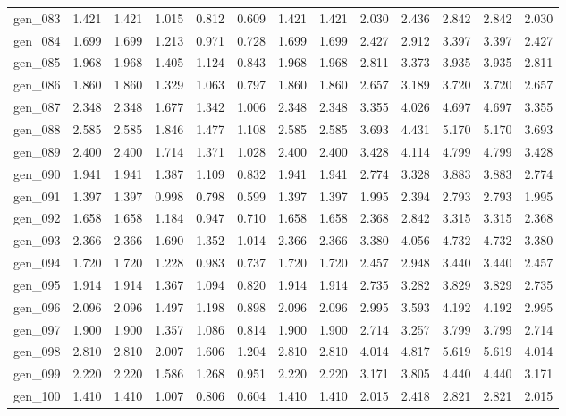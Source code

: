 \begin{tabular}{lrrrrrrrrrrrr}
gen\_083 &  1.421 &  1.421 &  1.015 &  0.812 &  0.609 &  1.421 &  1.421 &  2.030 &  2.436 &  2.842 &  2.842 &  2.030 \\
gen\_084 &  1.699 &  1.699 &  1.213 &  0.971 &  0.728 &  1.699 &  1.699 &  2.427 &  2.912 &  3.397 &  3.397 &  2.427 \\
gen\_085 &  1.968 &  1.968 &  1.405 &  1.124 &  0.843 &  1.968 &  1.968 &  2.811 &  3.373 &  3.935 &  3.935 &  2.811 \\
gen\_086 &  1.860 &  1.860 &  1.329 &  1.063 &  0.797 &  1.860 &  1.860 &  2.657 &  3.189 &  3.720 &  3.720 &  2.657 \\
gen\_087 &  2.348 &  2.348 &  1.677 &  1.342 &  1.006 &  2.348 &  2.348 &  3.355 &  4.026 &  4.697 &  4.697 &  3.355 \\
gen\_088 &  2.585 &  2.585 &  1.846 &  1.477 &  1.108 &  2.585 &  2.585 &  3.693 &  4.431 &  5.170 &  5.170 &  3.693 \\
gen\_089 &  2.400 &  2.400 &  1.714 &  1.371 &  1.028 &  2.400 &  2.400 &  3.428 &  4.114 &  4.799 &  4.799 &  3.428 \\
gen\_090 &  1.941 &  1.941 &  1.387 &  1.109 &  0.832 &  1.941 &  1.941 &  2.774 &  3.328 &  3.883 &  3.883 &  2.774 \\
gen\_091 &  1.397 &  1.397 &  0.998 &  0.798 &  0.599 &  1.397 &  1.397 &  1.995 &  2.394 &  2.793 &  2.793 &  1.995 \\
gen\_092 &  1.658 &  1.658 &  1.184 &  0.947 &  0.710 &  1.658 &  1.658 &  2.368 &  2.842 &  3.315 &  3.315 &  2.368 \\
gen\_093 &  2.366 &  2.366 &  1.690 &  1.352 &  1.014 &  2.366 &  2.366 &  3.380 &  4.056 &  4.732 &  4.732 &  3.380 \\
gen\_094 &  1.720 &  1.720 &  1.228 &  0.983 &  0.737 &  1.720 &  1.720 &  2.457 &  2.948 &  3.440 &  3.440 &  2.457 \\
gen\_095 &  1.914 &  1.914 &  1.367 &  1.094 &  0.820 &  1.914 &  1.914 &  2.735 &  3.282 &  3.829 &  3.829 &  2.735 \\
gen\_096 &  2.096 &  2.096 &  1.497 &  1.198 &  0.898 &  2.096 &  2.096 &  2.995 &  3.593 &  4.192 &  4.192 &  2.995 \\
gen\_097 &  1.900 &  1.900 &  1.357 &  1.086 &  0.814 &  1.900 &  1.900 &  2.714 &  3.257 &  3.799 &  3.799 &  2.714 \\
gen\_098 &  2.810 &  2.810 &  2.007 &  1.606 &  1.204 &  2.810 &  2.810 &  4.014 &  4.817 &  5.619 &  5.619 &  4.014 \\
gen\_099 &  2.220 &  2.220 &  1.586 &  1.268 &  0.951 &  2.220 &  2.220 &  3.171 &  3.805 &  4.440 &  4.440 &  3.171 \\
gen\_100 &  1.410 &  1.410 &  1.007 &  0.806 &  0.604 &  1.410 &  1.410 &  2.015 &  2.418 &  2.821 &  2.821 &  2.015 \\
\bottomrule
\end{tabular}
